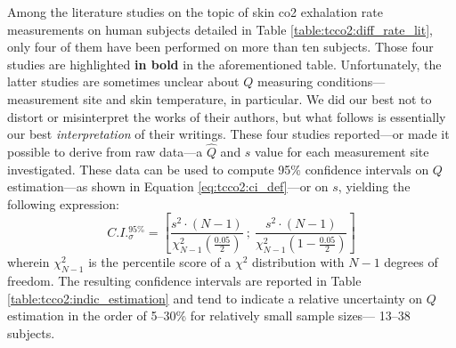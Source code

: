 Among the literature studies on the topic of skin \gls{co2} exhalation rate measurements on human subjects detailed in Table \ref{table:tcco2:diff_rate_lit}, only four of them have been performed on more than ten subjects. Those four studies are highlighted \textbf{in bold} in the aforementioned table. Unfortunately, the latter studies are sometimes unclear about $Q$ measuring conditions---measurement site and skin temperature, in particular. We did our best not to distort or misinterpret the works of their authors, but what follows is essentially our best \emph{interpretation} of their writings. These four studies reported---or made it possible to derive from raw data---a $\widehat{Q}$ and $s$ value for each measurement site investigated. These data can be used to compute 95\% confidence intervals on $Q$ estimation---as shown in Equation \ref{eq:tcco2:ci_def}---or on $s$, yielding the following expression\cite[Chap.~4]{ambrosius2007topics}:
\begin{equation}\label{eq:tcco2:sigma_ci}
	C.I._{\sigma}^{95\%} = \left[ \frac{s^2 \cdot (N-1)}{\chi^2_{N-1}\left(\frac{0.05}{2}\right)} \ ; \ \frac{s^2 \cdot (N-1)}{\chi^2_{N-1}\left(1 - \frac{0.05}{2}\right)} \right]
\end{equation}
wherein $\chi^2_{N-1}$ is the percentile score of a $\chi^2$ distribution with $N-1$ degrees of freedom. The resulting confidence intervals are reported in Table \ref{table:tcco2:indic_estimation} and tend to indicate a relative uncertainty on $Q$ estimation in the order of 5--30\% for relatively small sample sizes---\ie{} 13--38 subjects.

